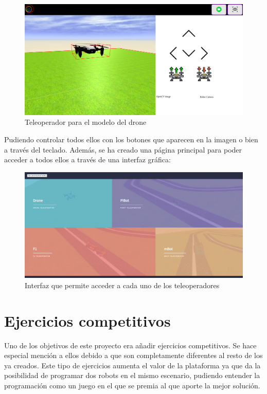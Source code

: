 \begin{figure}[H]
    \centering
    \includegraphics[scale=0.3]{img/drone_teleoperator.png}
    \caption{Teleoperador para el modelo del drone} \label{fig:drone_teleoperator}
\end{figure}
    
Pudiendo controlar todos ellos con los botones que aparecen en la imagen o bien a través del teclado. 
Además, se ha creado una página principal para poder acceder a todos ellos a través de una interfaz gráfica: 

 \begin{figure}[H]
    \centering
    \includegraphics[scale=0.25]{img/teleoperators.png}
    \caption{Interfaz que permite acceder a cada uno de los teleoperadores} \label{fig:teleoperators}
\end{figure}

\section{Ejercicios competitivos}
\label{sec:competitive}
Uno de los objetivos de este proyecto era añadir ejercicios competitivos. Se hace especial mención a ellos debido a que son completamente diferentes al resto de los ya creados. Este tipo de ejercicios aumenta el valor de la plataforma ya que da la posibilidad de programar dos robots en el mismo escenario, pudiendo entender la programación como un juego en el que se premia al que aporte la mejor solución.

